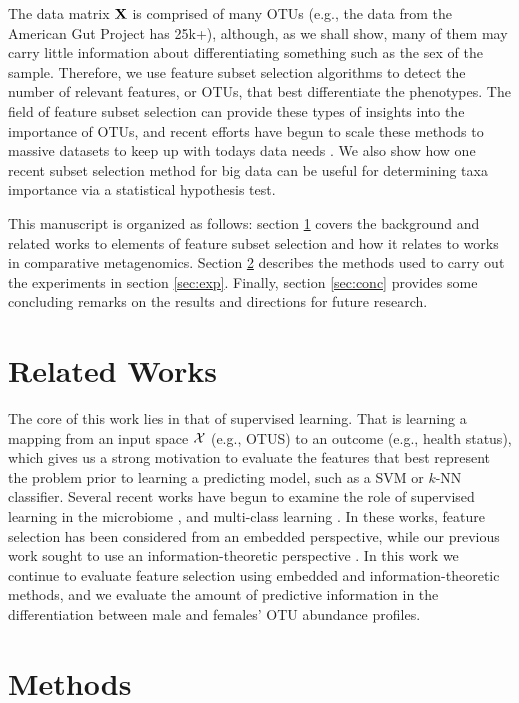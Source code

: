 \documentclass{acm_proc_article-sp}
\begin{document}
The data matrix ${\mathbf X}$ is comprised of many OTUs (e.g., the data from the American Gut Project has 25k+), although, as we shall show, many of them may carry little information about differentiating  something such as the sex of the sample. Therefore, we use feature subset selection algorithms to detect the number of relevant features, or OTUs, that best differentiate the phenotypes. The field of feature subset selection can provide these types of insights into the importance of OTUs, and recent efforts have begun to scale these methods to massive datasets to keep up with todays data needs \cite{Zhia2014CIM, Liu2010FSW}. We also show how one recent subset selection method for big data can be useful for determining taxa importance via a statistical hypothesis test. 

This manuscript is organized as follows: section \ref{sec:rwork} covers the background and related works to elements of feature subset selection and how it relates to works in comparative metagenomics. Section \ref{sec:methods} describes the methods used to carry out the experiments in section \ref{sec:exp}. Finally, section \ref{sec:conc} provides some concluding remarks on the results and directions for future research. 



\section{Related Works}
\label{sec:rwork}

The core of this work lies in that of supervised learning. That is learning a mapping from an input space ${\mathcal X}$ (e.g., OTUS) to an outcome (e.g., health status), which gives us a strong motivation to evaluate the features that best represent the problem prior to learning a predicting model, such as a SVM or $k$-NN classifier. Several recent works have begun to examine the role of supervised learning in the microbiome \cite{Knights2011FEMS, Fierer2010NAS},  and multi-class learning \cite{Lui2011Bio}. In these works, feature selection has been considered from an embedded perspective, while our previous work sought to use an information-theoretic perspective \cite{Garbarine2011CBC, Ditzler2012ICASSP, Ditzler2012GENSIPS}. In this work we continue to evaluate feature selection using embedded and information-theoretic methods, and we evaluate the amount of predictive information in the differentiation between male and females' OTU abundance profiles. 


\section{Methods}
\label{sec:methods}
\end{document}
